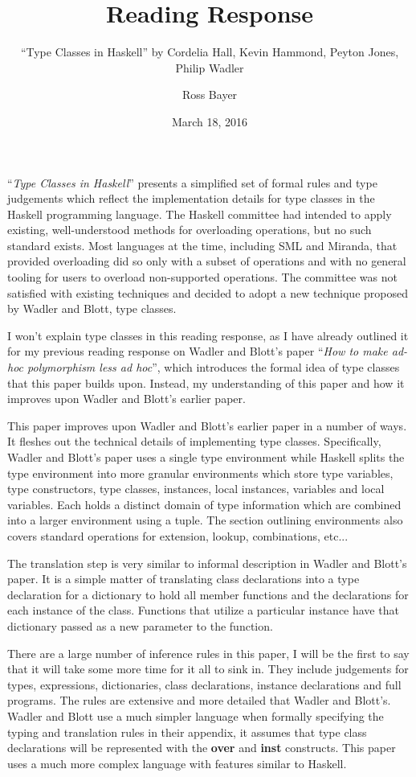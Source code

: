 \documentclass[a4paper,fleqn,notitlepage]{scrartcl}
\title{Reading Response}
\subtitle{\normalfont ``Type Classes in Haskell'' by Cordelia Hall, Kevin
    Hammond, Peyton Jones, Philip Wadler}
\author{Ross Bayer}
\date{March 18, 2016}
\begin{document}
\maketitle


``\textit{Type Classes in Haskell}'' presents a simplified set of formal rules
and type judgements which reflect the implementation details for type classes in
the Haskell programming language. The Haskell committee had intended to apply
existing, well-understood methods for overloading operations, but no such
standard exists. Most languages at the time, including SML and Miranda, that
provided overloading did so only with a subset of operations and with no general
tooling for users to overload non-supported operations. The committee was not
satisfied with existing techniques and decided to adopt a new technique proposed
by Wadler and Blott, type classes.

I won't explain type classes in this reading response, as I have already
outlined it for my previous reading response on Wadler and Blott's paper
``\textit{How to make ad-hoc polymorphism less ad hoc}'', which introduces the
formal idea of type classes that this paper builds upon. Instead, my
understanding of this paper and how it improves upon Wadler and Blott's earlier
paper.

This paper improves upon Wadler and Blott's earlier paper in a number of ways.
It fleshes out the technical details of implementing type classes. Specifically,
Wadler and Blott's paper uses a single type environment while Haskell splits the
type environment into more granular environments which store type variables, type
constructors, type classes, instances, local instances, variables and local
variables. Each holds a distinct domain of type information which are combined
into a larger environment using a tuple. The section outlining environments also
covers standard operations for extension, lookup, combinations, etc...

The translation step is very similar to informal description in Wadler and Blott's
paper. It is a simple matter of translating class declarations into a type
declaration for a dictionary to hold all member functions and the declarations
for each instance of the class. Functions that utilize a particular instance have
that dictionary passed as a new parameter to the function.

There are a large number of inference rules in this paper, I will be the first
to say that it will take some more time for it all to sink in. They include
judgements for types, expressions, dictionaries, class declarations,
instance declarations and full programs. The rules are extensive and more
detailed that Wadler and Blott's. Wadler and Blott use a much simpler language
when formally specifying the typing and translation rules in their appendix,
it assumes that type class declarations will be represented with the
\textbf{over} and \textbf{inst} constructs. This paper uses a much more complex
language with features similar to Haskell.
\end{document}
